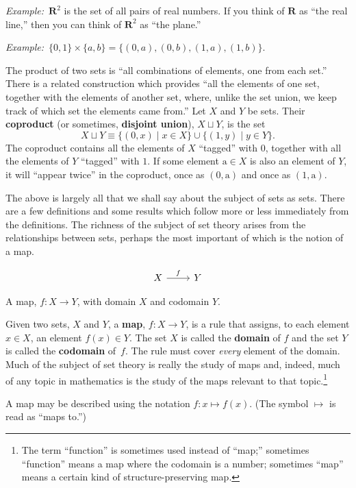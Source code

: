 \documentclass[12pt, a4paper]{article}
\newcommand{\defn}[1]{\textbf{#1}}
\newcommand{\set}[1]{\mathbold{#1}}
\newcommand{\eg}{\emph{Example:}\relax}
\begin{document}
\eg\ $\set{R}^2$ is the set of all pairs of real numbers. If you think
of $\set{R}$ as ``the real line,'' then you can think of $\set{R}^2$
as ``the plane.''

\eg\ $\{0,1\}\times\{a, b\} = \{(0,a), (0,b), (1,a), (1,b)\}$. 

The product of two sets is “all combinations of elements, one from
each set.” There is a related construction which provides “all the
elements of one set, together with the elements of another set, where,
unlike the set union, we keep track of which set the elements came
from.” Let $X$ and $Y$ be sets. Their \defn{coproduct} (or sometimes,
\defn{disjoint union}), $X \sqcup Y$, is the set
\begin{equation*}
  X \sqcup Y \equiv \{(0,x) \mid x\in X\} \cup \{(1, y)\mid y\in Y\}.
\end{equation*}
The coproduct contains all the elements of $X$ “tagged” with $0$,
together with all the elements of $Y$ “tagged” with $1$. If some
element $\text{a}\in X$ is also an element of $Y$, it will “appear twice” in the
coproduct, once as $(0,\text{a})$ and once as $(1,\text{a})$. 

The above is largely all that we shall say about the subject of sets
as sets. There are a few definitions and some results which follow
more or less immediately from the definitions. The richness of the
subject of set theory arises from the relationships between sets,
perhaps the most important of which is the notion of a map.

\begin{sidefigure}
  \[\begin{tikzcd}
    X \arrow[r, "f"] & Y
  \end{tikzcd}\]
  \caption{A map, $f\colon X\to Y$, with domain $X$ and codomain $Y$.}
\end{sidefigure}
Given two sets, $X$ and $Y$, a \defn{map}, $f\colon X \to Y$, is a rule
that assigns, to each element $x \in X$, an element $f(x) \in Y$. The set
$X$ is called the \defn{domain} of $f$ and the set $Y$ is called the
\defn{codomain} of~$f$. The rule must cover \emph{every} element of
the domain. Much of the subject of set theory is really the study of
maps and, indeed, much of any topic in mathematics is the study of the
maps relevant to that topic.\footnote{The term “function” is sometimes
  used instead of “map;” sometimes “function” means a map where the
  codomain is a number; sometimes “map” means a certain kind of
  structure-preserving map.}

A map may be described using the notation $f\colon x\mapsto f(x)$. (The
symbol $\mapsto$ is read as ``maps to.'')
\end{document}
